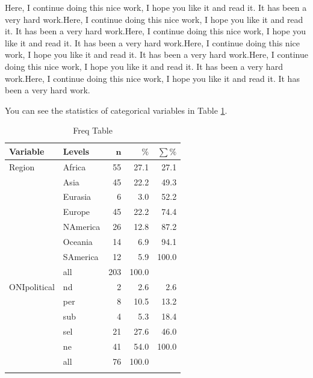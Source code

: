 \documentclass[11pt]{article}
\begin{document}
Here, I continue doing this nice work, I hope you like it and read it. It has been a very hard work.Here, I continue doing this nice work, I hope you like it and read it. It has been a very hard work.Here, I continue doing this nice work, I hope you like it and read it. It has been a very hard work.Here, I continue doing this nice work, I hope you like it and read it. It has been a very hard work.Here, I continue doing this nice work, I hope you like it and read it. It has been a very hard work.Here, I continue doing this nice work, I hope you like it and read it. It has been a very hard work.

You can see the statistics of categorical variables in Table \ref{catexplore_table}.




\begingroup\normalsize
\begin{longtable}{llrrr}
\caption{Freq Table} \\ 
 \textbf{Variable} & \textbf{Levels} & $\mathbf{n}$ & $\mathbf{\%}$ & $\mathbf{\sum \%}$ \\ 
  \hline
Region & Africa & 55 & 27.1 & 27.1 \\ 
   & Asia & 45 & 22.2 & 49.3 \\ 
   & Eurasia & 6 & 3.0 & 52.2 \\ 
   & Europe & 45 & 22.2 & 74.4 \\ 
   & NAmerica & 26 & 12.8 & 87.2 \\ 
   & Oceania & 14 & 6.9 & 94.1 \\ 
   & SAmerica & 12 & 5.9 & 100.0 \\ 
   \hline
 & all & 203 & 100.0 &  \\ 
   \hline
\hline
ONIpolitical & nd & 2 & 2.6 & 2.6 \\ 
   & per & 8 & 10.5 & 13.2 \\ 
   & sub & 4 & 5.3 & 18.4 \\ 
   & sel & 21 & 27.6 & 46.0 \\ 
   & ne & 41 & 54.0 & 100.0 \\ 
   \hline
 & all & 76 & 100.0 &  \\ 
   \hline
\hline
\hline
\label{catexplore_table}
\end{longtable}
\endgroup

\end{document}
